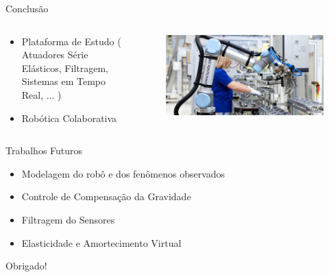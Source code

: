 \documentclass{beamer}
\begin{document}
\begin{frame}{Conclusão}
\begin{columns}
\begin{column}{0.4\textwidth}
\begin{itemize}
    \item Plataforma de Estudo ( Atuadores Série Elásticos, Filtragem, Sistemas em Tempo Real, ... )
    \item Robótica Colaborativa
\end{itemize}
\end{column}
\begin{column}{0.6\textwidth}  %
\begin{figure}
    \centering
    \includegraphics[width = \linewidth]{tex/figs/ur-production.jpg}
\end{figure}
\end{column}
\end{columns}
\end{frame}

\begin{frame}{Trabalhos Futuros}
\begin{itemize}
    \item Modelagem do robô e dos fenômenos observados
    \item Controle de Compensação da Gravidade
    \item Filtragem do Sensores
    \item Elasticidade e Amortecimento Virtual
\end{itemize}
\end{frame}

\begin{frame}{}
\centering
\Huge{Obrigado!}
\end{frame}


\end{document}
